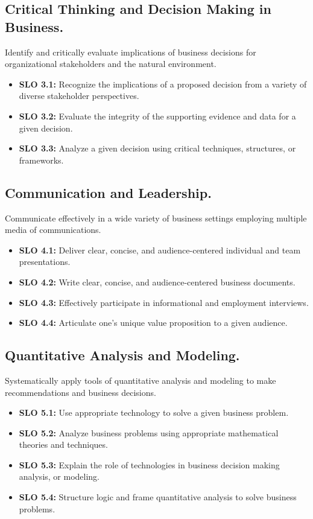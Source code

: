 \documentclass[12pt]{article} %
\begin{document}
\subsection{Critical Thinking and Decision Making in Business.}
Identify and critically evaluate implications of business decisions for organizational stakeholders and the natural environment.
\begin{itemize}
	\item\textbf{SLO 3.1:} Recognize the implications of a proposed decision from a variety of diverse stakeholder perspectives.
	\item\textbf{SLO 3.2:} Evaluate the integrity of the supporting evidence and data for a given decision.
	\item\textbf{SLO 3.3:} Analyze a given decision using critical techniques, structures, or frameworks.
\end{itemize}
\subsection{Communication and Leadership.}
Communicate effectively in a wide variety of business settings employing multiple media of communications.
\begin{itemize}
	\item\textbf{SLO 4.1:} Deliver clear, concise, and audience-centered individual and team presentations.
	\item\textbf{SLO 4.2:} Write clear, concise, and audience-centered business documents.
	\item\textbf{SLO 4.3:} Effectively participate in informational and employment interviews.
	\item\textbf{SLO 4.4:} Articulate one’s unique value proposition to a given audience.
\end{itemize}
\subsection{Quantitative Analysis and Modeling.}
Systematically apply tools of quantitative analysis and modeling to make recommendations and business decisions.
\begin{itemize}
	\item\textbf{SLO 5.1:} Use appropriate technology to solve a given business problem.
	\item\textbf{SLO 5.2:} Analyze business problems using appropriate mathematical theories and techniques.
	\item\textbf{SLO 5.3:} Explain the role of technologies in business decision making analysis, or modeling.
	\item\textbf{SLO 5.4:} Structure logic and frame quantitative analysis to solve business problems.
\end{itemize}
\end{document}
